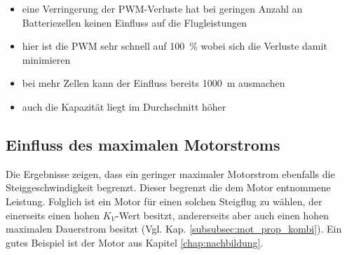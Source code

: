 \begin{itemize}
	\item eine Verringerung der PWM-Verluste hat bei geringen Anzahl an Batteriezellen keinen Einfluss auf die Flugleistungen
	\item hier ist die PWM sehr schnell auf \SI{100}{\%} wobei sich die Verluste damit minimieren
	\item bei mehr Zellen kann der Einfluss bereits \SI{1000}{m} ausmachen
	\item auch die Kapazität liegt im Durchschnitt höher 
\end{itemize}

\subsection{Einfluss des maximalen Motorstroms}
Die Ergebnisse zeigen, dass ein geringer maximaler Motorstrom ebenfalls die Steiggeschwindigkeit begrenzt. Dieser begrenzt die dem Motor entnommene Leistung. 
Folglich ist ein Motor für einen solchen Steigflug zu wählen, der einerseits einen hohen \ensuremath{K_V}-Wert besitzt, andererseits aber auch einen hohen maximalen Dauerstrom besitzt (Vgl. Kap. \ref{subsubsec:mot_prop_kombi}). Ein gutes Beispiel ist der Motor aus Kapitel \ref{chap:nachbildung}.

